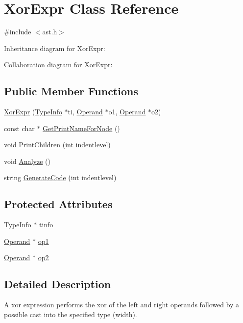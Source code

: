 \hypertarget{class_xor_expr}{}\section{Xor\+Expr Class Reference}
\label{class_xor_expr}


{\ttfamily \#include $<$ast.\+h$>$}



Inheritance diagram for Xor\+Expr\+:


Collaboration diagram for Xor\+Expr\+:
\subsection*{Public Member Functions}
\begin{DoxyCompactItemize}
\item 
\hyperlink{class_xor_expr_a3221fdaf30721d0fcaf55f6bff051f90}{Xor\+Expr} (\hyperlink{class_type_info}{Type\+Info} $\ast$ti, \hyperlink{class_operand}{Operand} $\ast$o1, \hyperlink{class_operand}{Operand} $\ast$o2)
\item 
const char $\ast$ \hyperlink{class_xor_expr_a2620f3b842a78c700d5ea2b1e357ec26}{Get\+Print\+Name\+For\+Node} ()
\item 
void \hyperlink{class_xor_expr_a36c306045f71b8fc6448b2a74d0d4a4e}{Print\+Children} (int indentlevel)
\item 
void \hyperlink{class_xor_expr_a94f8a8dfc88b60756ed6487299a1d74d}{Analyze} ()
\item 
string \hyperlink{class_xor_expr_a527ab580326a7a6f40083de3c2d2a6a4}{Generate\+Code} (int indentlevel)
\end{DoxyCompactItemize}
\subsection*{Protected Attributes}
\begin{DoxyCompactItemize}
\item 
\hyperlink{class_type_info}{Type\+Info} $\ast$ \hyperlink{class_xor_expr_a87b05f2fd9fa26e3c87f96f635240631}{tinfo}
\item 
\hyperlink{class_operand}{Operand} $\ast$ \hyperlink{class_xor_expr_a062091e04a196aa0932afcbe7409abce}{op1}
\item 
\hyperlink{class_operand}{Operand} $\ast$ \hyperlink{class_xor_expr_ad964f5853c06918d1e7472e921b6878b}{op2}
\end{DoxyCompactItemize}


\subsection{Detailed Description}
A xor expression performs the xor of the left and right operands followed by a possible cast into the specified type (width). 

